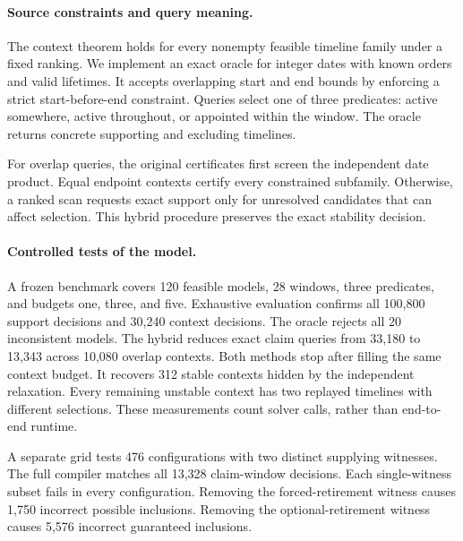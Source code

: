 \paragraph{Source constraints and query meaning.}
The context theorem holds for every nonempty feasible timeline family under a fixed ranking.
We implement an exact oracle for integer dates with known orders and valid lifetimes.
It accepts overlapping start and end bounds by enforcing a strict start-before-end constraint.
Queries select one of three predicates: active somewhere, active throughout, or appointed within the window.
The oracle returns concrete supporting and excluding timelines.

For overlap queries, the original certificates first screen the independent date product.
Equal endpoint contexts certify every constrained subfamily.
Otherwise, a ranked scan requests exact support only for unresolved candidates that can affect selection.
This hybrid procedure preserves the exact stability decision.

\paragraph{Controlled tests of the model.}
A frozen benchmark covers 120 feasible models, 28 windows, three predicates, and budgets one, three, and five.
Exhaustive evaluation confirms all 100,800 support decisions and 30,240 context decisions.
The oracle rejects all 20 inconsistent models.
The hybrid reduces exact claim queries from 33,180 to 13,343 across 10,080 overlap contexts.
Both methods stop after filling the same context budget.
It recovers 312 stable contexts hidden by the independent relaxation.
Every remaining unstable context has two replayed timelines with different selections.
These measurements count solver calls, rather than end-to-end runtime.

A separate grid tests 476 configurations with two distinct supplying witnesses.
The full compiler matches all 13,328 claim-window decisions.
Each single-witness subset fails in every configuration.
Removing the forced-retirement witness causes 1,750 incorrect possible inclusions.
Removing the optional-retirement witness causes 5,576 incorrect guaranteed inclusions.
